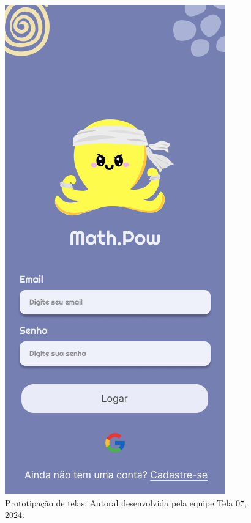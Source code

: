 \documentclass[12pt, openany, oneside, a4paper, english, brazil]{abntex2}   %
\begin{document}
\begin{figure}
    \centering
    \includegraphics[scale=0.7]{figuras/Math.Pow App/Login.png}
    \caption{Prototipação de telas: Autoral desenvolvida pela equipe Tela 07, 2024.}
    \label{fig:nome-da-imagem}
\end{figure}
\end{document}
